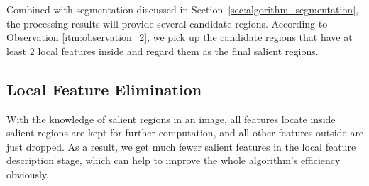 Combined with segmentation discussed in Section~\ref{sec:algorithm_segmentation}, the processing results will provide several candidate regions. According to Observation \ref{itm:observation_2}, we pick up the candidate regions that have at least 2 local features inside and regard them as the final salient regions.

\subsection{Local Feature Elimination}
\label{sec:algorithm_elimation}

With the knowledge of salient regions in an image, all features locate inside salient regions are kept for further computation, and all other features outside are just dropped. As a result, we get much fewer salient features in the local feature description stage, which can help to improve the whole algorithm's efficiency obviously.

